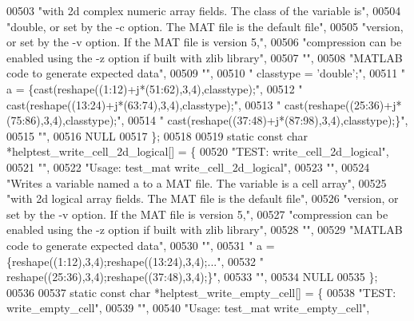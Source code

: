\begin{DoxyCode}
{{00503     \textcolor{stringliteral}{"with 2d complex numeric array fields. The class of the variable is"},
00504     \textcolor{stringliteral}{"double, or set by the -c option. The MAT file is the default file"},
00505     \textcolor{stringliteral}{"version, or set by the -v option. If the MAT file is version 5,"},
00506     \textcolor{stringliteral}{"compression can be enabled using the -z option if built with zlib library"},
00507     \textcolor{stringliteral}{""},
00508     \textcolor{stringliteral}{"MATLAB code to generate expected data"},
00509     \textcolor{stringliteral}{""},
00510     \textcolor{stringliteral}{"    classtype = 'double';"},
00511     \textcolor{stringliteral}{"    a = \{cast(reshape((1:12)+j*(51:62),3,4),classtype);"},
00512     \textcolor{stringliteral}{"         cast(reshape((13:24)+j*(63:74),3,4),classtype);"},
00513     \textcolor{stringliteral}{"         cast(reshape((25:36)+j*(75:86),3,4),classtype);"},
00514     \textcolor{stringliteral}{"         cast(reshape((37:48)+j*(87:98),3,4),classtype);\}"},
00515     \textcolor{stringliteral}{""},
00516     NULL
00517 \};
00518 
00519 \textcolor{keyword}{static} \textcolor{keyword}{const} \textcolor{keywordtype}{char} *helptest\_write\_cell\_2d\_logical[] = \{
00520     \textcolor{stringliteral}{"TEST: write\_cell\_2d\_logical"},
00521     \textcolor{stringliteral}{""},
00522     \textcolor{stringliteral}{"Usage: test\_mat write\_cell\_2d\_logical"},
00523     \textcolor{stringliteral}{""},
00524     \textcolor{stringliteral}{"Writes a variable named a to a MAT file. The variable is a cell array"},
00525     \textcolor{stringliteral}{"with 2d logical array fields. The MAT file is the default file"},
00526     \textcolor{stringliteral}{"version, or set by the -v option. If the MAT file is version 5,"},
00527     \textcolor{stringliteral}{"compression can be enabled using the -z option if built with zlib library"},
00528     \textcolor{stringliteral}{""},
00529     \textcolor{stringliteral}{"MATLAB code to generate expected data"},
00530     \textcolor{stringliteral}{""},
00531     \textcolor{stringliteral}{"    a = \{reshape((1:12),3,4);reshape((13:24),3,4);..."},
00532     \textcolor{stringliteral}{"         reshape((25:36),3,4);reshape((37:48),3,4);\}"},
00533     \textcolor{stringliteral}{""},
00534     NULL
00535 \};
00536 
00537 \textcolor{keyword}{static} \textcolor{keyword}{const} \textcolor{keywordtype}{char} *helptest\_write\_empty\_cell[] = \{
00538     \textcolor{stringliteral}{"TEST: write\_empty\_cell"},
00539     \textcolor{stringliteral}{""},
00540     \textcolor{stringliteral}{"Usage: test\_mat write\_empty\_cell"},
}}
\end{DoxyCode}
